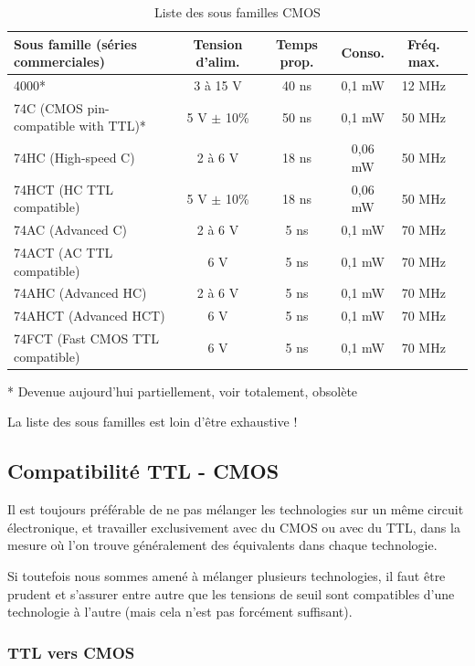 \documentclass[a4paper]{article}
\begin{document}
\begin{table}[H]
	\centering
		\begin{tabular}{|l|c|c|c|c|c|}\hline
				Sous famille (séries commerciales) & Tension d'alim. & Temps prop. & Conso. & Fréq. max.\\\hline\hline
				4000* & 3 à 15 V & 40 ns & 0,1 mW & 12 MHz\\\hline
				74C (\ac{CMOS} pin-compatible with \ac{TTL})* & 5 V $\pm$ 10\% & 50 ns & 0,1 mW & 50 MHz\\\hline
				74HC (High-speed C) & 2 à 6 V & 18 ns & 0,06 mW & 50 MHz\\\hline
				74HCT (HC \ac{TTL} compatible) & 5 V $\pm$ 10\% & 18 ns & 0,06 mW & 50 MHz\\\hline
				74AC (Advanced C) & 2 à 6 V & 5 ns & 0,1 mW & 70 MHz\\\hline
				74ACT (AC \ac{TTL} compatible) & 6 V & 5 ns & 0,1 mW & 70 MHz\\\hline
				74AHC (Advanced HC) & 2 à 6 V & 5 ns & 0,1 mW & 70 MHz\\\hline
				74AHCT (Advanced HCT) & 6 V & 5 ns & 0,1 mW & 70 MHz\\\hline
				74FCT (Fast \ac{CMOS} \ac{TTL} compatible) & 6 V & 5 ns & 0,1 mW & 70 MHz\\\hline
		\end{tabular}
	\caption{Liste des sous familles \ac{CMOS}
		\label{Liste_des_sous_familles_CMOS}}
\end{table}
* Devenue aujourd'hui partiellement, voir totalement, obsolète

La liste des sous familles est loin d'être exhaustive !

\subsection{Compatibilité TTL - CMOS}

Il est toujours préférable de ne pas mélanger les technologies sur un même circuit électronique, et travailler exclusivement avec du \ac{CMOS} ou avec du \ac{TTL}, dans la mesure où l'on trouve généralement des équivalents dans chaque technologie.

Si toutefois nous sommes amené à mélanger plusieurs technologies, il faut être prudent et s'assurer entre autre que les tensions de seuil sont compatibles d'une technologie à l'autre (mais cela n'est pas forcément suffisant).

\subsubsection{TTL vers CMOS}
\end{document}
